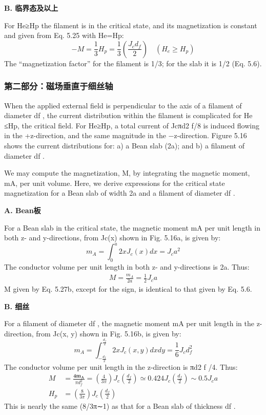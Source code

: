 \textbf{B. 临界态及以上}

For He≥Hp the filament is in the critical state, and its magnetization is constant
and given from Eq. 5.25 with He=Hp:
\begin{equation}%
-M=\frac{1}{3}H_{p}=\frac{1}{3}(\frac{J_{c}d_{f}}{2})\quad(H_{e}\geq H_{p})
\end{equation}
The “magnetization factor” for the filament is 1/3; for the slab it is 1/2 (Eq. 5.6).

\subsubsection{第二部分：磁场垂直于细丝轴}
When the applied external field is perpendicular to the axis of a filament of diameter
df , the current distribution within the filament is complicated for He ≤Hp,
the critical field. For He≥Hp, a total current of Jcπd2
f/8 is induced flowing in the
+z-direction, and the same magnitude in the −z-direction. Figure 5.16 shows the
current distributions for: a) a Bean slab (2a); and b) a filament of diameter df .

We may compute the magnetization, M, by integrating the magnetic moment, mA,
per unit volume. Here, we derive expressions for the critical state magnetization
for a Bean slab of width 2a and a filament of diameter df .

\textbf{A. Bean板}

For a Bean slab in the critical state, the magnetic moment mA per unit length in
both z- and y-directions, from Jc(x) shown in Fig. 5.16a, is given by:
\begin{equation}%
m_{A}=\int_{0}^{a}2xJ_{c}(x)dx=J_{c}a^{2}
\end{equation}
The conductor volume per unit length in both z- and y-directions is 2a. Thus:
\begin{align*}%
M=\frac{m_{A}}{2a}=\frac{1}{2}J_{c}a\tag{5.27b}
\end{align*}
M given by Eq. 5.27b, except for the sign, is identical to that given by Eq. 5.6.

\textbf{B. 细丝}

For a filament of diameter df , the magnetic moment mA per unit length in the
z-direction, from Jc(x, y) shown in Fig. 5.16b, is given by:
\begin{equation}%
m_{A}=\int_{-\frac{d_{f}}{2}}^{\frac{d_{f}}{2}}2xJ_{c}(x,y)dxdy=\frac{1}{6}J_{c}d_{f}^{2}
\end{equation}
The conductor volume per unit length in the z-direction is πd2
f /4. Thus:
\begin{subequations}
	\begin{align*}
M&=\frac{\mathbf{4m_{A}}}{\pi d_{f}^{2}}=(\frac{4}{3\pi})J_{c}(\frac{d_{f}}{2})\simeq0.424J_{c}(\frac{d_{f}}{2})\sim0.5J_{c}a\\
H_{p}&=(\frac{8}{3\pi})J_{c}(\frac{d_{f}}{2})
	\end{align*}
\end{subequations}
This is nearly the same (8/3π∼1) as that for a Bean slab of thickness df .


